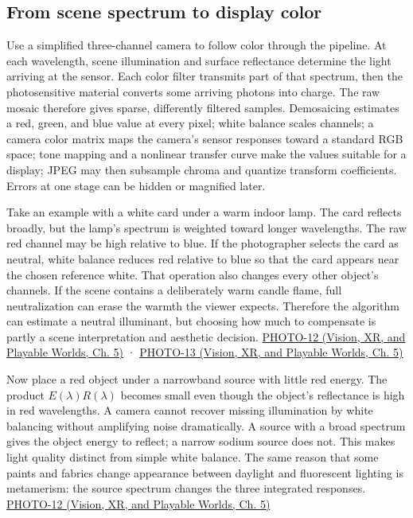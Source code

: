 \subsection{From scene spectrum to display color}\label{03-visual-computing-i-ch004-from-scene-spectrum-to-display-color}

\hypertarget{03-visual-computing-i-ch004-from-scene-spectrum-to-display-color}{}

Use a simplified three-channel camera to follow color through the pipeline. At each wavelength, scene illumination and surface reflectance determine the light arriving at the sensor. Each color filter transmits part of that spectrum, then the photosensitive material converts some arriving photons into charge. The raw mosaic therefore gives sparse, differently filtered samples. Demosaicing estimates a red, green, and blue value at every pixel; white balance scales channels; a camera color matrix maps the camera's sensor responses toward a standard RGB space; tone mapping and a nonlinear transfer curve make the values suitable for a display; JPEG may then subsample chroma and quantize transform coefficients. Errors at one stage can be hidden or magnified later.

Take an example with a white card under a warm indoor lamp. The card reflects broadly, but the lamp's spectrum is weighted toward longer wavelengths. The raw red channel may be high relative to blue. If the photographer selects the card as neutral, white balance reduces red relative to blue so that the card appears near the chosen reference white. That operation also changes every other object's channels. If the scene contains a deliberately warm candle flame, full neutralization can erase the warmth the viewer expects. Therefore the algorithm can estimate a neutral illuminant, but choosing how much to compensate is partly a scene interpretation and aesthetic decision. \href{../07-Vision-XR-and-Playable-Worlds/main.pdf\#nameddest=04-visual-computing-ii-ch036-photo-12---photography-session-12}{PHOTO-12 (Vision, XR, and Playable Worlds, Ch. 5)} · \href{../07-Vision-XR-and-Playable-Worlds/main.pdf\#nameddest=04-visual-computing-ii-ch036-photo-13---photography-session-13}{PHOTO-13 (Vision, XR, and Playable Worlds, Ch. 5)}

Now place a red object under a narrowband source with little red energy. The product \(E(\lambda)R(\lambda)\) becomes small even though the object's reflectance is high in red wavelengths. A camera cannot recover missing illumination by white balancing without amplifying noise dramatically. A source with a broad spectrum gives the object energy to reflect; a narrow sodium source does not. This makes light quality distinct from simple white balance. The same reason that some paints and fabrics change appearance between daylight and fluorescent lighting is metamerism: the source spectrum changes the three integrated responses. \href{../07-Vision-XR-and-Playable-Worlds/main.pdf\#nameddest=04-visual-computing-ii-ch036-photo-12---photography-session-12}{PHOTO-12 (Vision, XR, and Playable Worlds, Ch. 5)}

